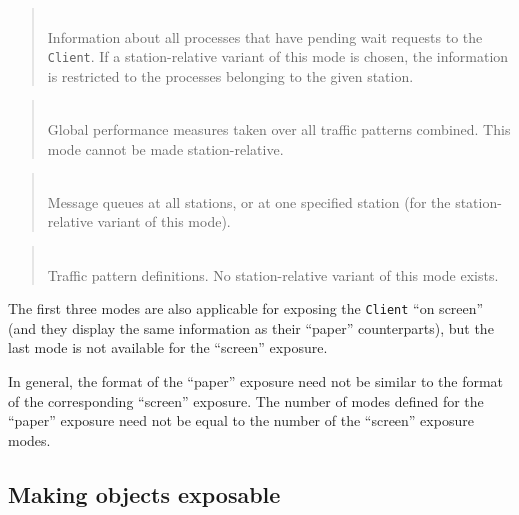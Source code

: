 \begin{quote}
\noindent{}\\ \hspace{0in}
Information about all processes that have pending wait requests to the
{\tt Client}.
If a station-relative variant of this mode is chosen, the information
is restricted to the processes belonging to the given station.
\end{quote}

\begin{quote}
\noindent{}\\ \hspace{0in}
Global performance measures taken over all traffic patterns combined.
This mode cannot be made station-relative.
\end{quote}

\begin{quote}
\noindent{}\\ \hspace{0in}
Message queues at all stations, or at one specified station (for the
station-relative variant of this mode).
\end{quote}

\begin{quote}
\noindent{}\\ \hspace{0in}
Traffic pattern definitions.
No station-relative variant of this mode exists.
\end{quote}\medskip

The first three modes are also applicable
for exposing the {\tt Client} ``on screen''
(and they display the same information as their ``paper'' counterparts),
but the last mode is not available for the ``screen'' exposure.

In general, the format of the ``paper'' exposure need not be
similar to the format of the corresponding ``screen'' exposure.
The number of modes defined for the ``paper'' exposure need not be equal
to the number of the ``screen'' exposure modes.

\subsection{Making objects exposable}
\label{rm_ex_mo}

